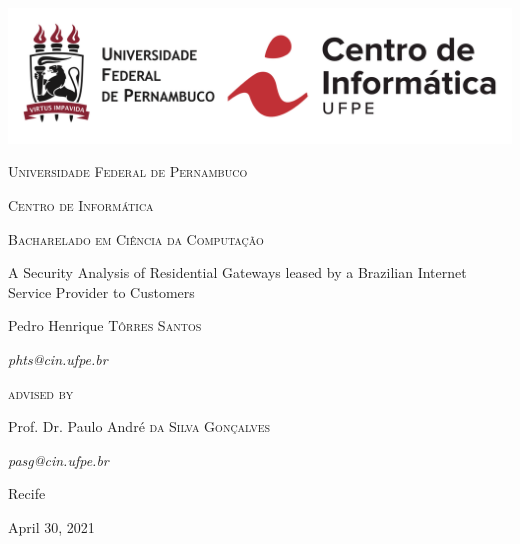 \begin{titlepage}
	\centering
    \includegraphics[width=\linewidth]{title-page/cin-ufpe.png}
	\vfill
    {\large\scshape Universidade Federal de Pernambuco\par}
    {\large\scshape Centro de Informática\par}
    {\large\scshape Bacharelado em Ciência da Computação\par}
	\vfill
	\vfill
	\vfill
	\vfill
	{\huge A Security Analysis of Residential Gateways leased by a Brazilian Internet Service Provider to Customers\par}
	\vfill
	{\large Pedro Henrique \textsc{Tôrres Santos}\par}
	{\large\itshape phts@cin.ufpe.br\par}
	\vfill
	\vfill
	\vfill
	\vfill
	{\scshape advised by\par}
	{\large Prof. Dr. Paulo André \textsc{da Silva Gonçalves}\par}
	{\large\itshape pasg@cin.ufpe.br\par}
	\vfill
	\vfill
	{\large Recife\par}
	{\large April 30, 2021\par}
\end{titlepage}
